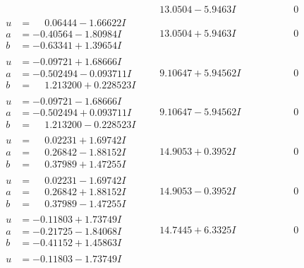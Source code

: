 \documentclass[1p]{elsarticle_modified}
\theoremstyle{definition}
\begin{document}
$$\begin{array}{c|c|c}
 & \phantom{-}13.0504 - 5.9463 I & \phantom{-0.000000 } 0 \\ \hline\begin{aligned}
u &= \phantom{-}0.06444 - 1.66622 I \\
a &= -0.40564 - 1.80984 I \\
b &= -0.63341 + 1.39654 I\end{aligned}
 & \phantom{-}13.0504 + 5.9463 I & \phantom{-0.000000 } 0 \\ \hline\begin{aligned}
u &= -0.09721 + 1.68666 I \\
a &= -0.502494 - 0.093711 I \\
b &= \phantom{-}1.213200 + 0.228523 I\end{aligned}
 & \phantom{-}9.10647 + 5.94562 I & \phantom{-0.000000 } 0 \\ \hline\begin{aligned}
u &= -0.09721 - 1.68666 I \\
a &= -0.502494 + 0.093711 I \\
b &= \phantom{-}1.213200 - 0.228523 I\end{aligned}
 & \phantom{-}9.10647 - 5.94562 I & \phantom{-0.000000 } 0 \\ \hline\begin{aligned}
u &= \phantom{-}0.02231 + 1.69742 I \\
a &= \phantom{-}0.26842 - 1.88152 I \\
b &= \phantom{-}0.37989 + 1.47255 I\end{aligned}
 & \phantom{-}14.9053 + 0.3952 I & \phantom{-0.000000 } 0 \\ \hline\begin{aligned}
u &= \phantom{-}0.02231 - 1.69742 I \\
a &= \phantom{-}0.26842 + 1.88152 I \\
b &= \phantom{-}0.37989 - 1.47255 I\end{aligned}
 & \phantom{-}14.9053 - 0.3952 I & \phantom{-0.000000 } 0 \\ \hline\begin{aligned}
u &= -0.11803 + 1.73749 I \\
a &= -0.21725 - 1.84068 I \\
b &= -0.41152 + 1.45863 I\end{aligned}
 & \phantom{-}14.7445 + 6.3325 I & \phantom{-0.000000 } 0 \\ \hline\begin{aligned}
u &= -0.11803 - 1.73749 I \\

\end{aligned}
\end{array}$$
\end{document}
